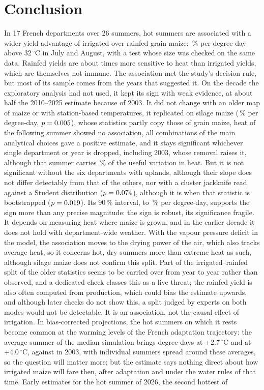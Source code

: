 \section{Conclusion}
\label{sec:conclusion}

In 17 French departments over 26 summers, hot summers are associated with a wider yield advantage of irrigated over rainfed grain maize: \QonePct\,\% per degree-day above 32\,$^{\circ}$C in July and August, with a test whose size was checked on the same data. Rainfed yields are about \QoneRatio{} times more sensitive to heat than irrigated yields, which are themselves not immune. The association met the study's decision rule, but most of its sample comes from the years that suggested it. On the decade the exploratory analysis had not used, it kept its sign with weak evidence, at about half the 2010--2025 estimate because of 2003. It did not change with an older map of maize or with station-based temperatures, it replicated on silage maize (\FodderPct\,\% per degree-day, $p = 0.005$), whose statistics partly copy those of grain maize, heat of the following summer showed no association, all \MultiN{} combinations of the main analytical choices gave a positive estimate, and it stays significant whichever single department or year is dropped, including 2003, whose removal raises it, although that summer carries \LevThree\,\% of the useful variation in heat. But it is not significant without the six departments with uplands, although their slope does not differ detectably from that of the others, nor with a cluster jackknife read against a Student distribution ($p = 0.074$), although it is when that statistic is bootstrapped ($p = 0.019$). Its 90\,\% interval, \CiNinetyLow{} to \CiNinetyHigh\,\% per degree-day, supports the sign more than any precise magnitude: the sign is robust, its significance fragile. It depends on measuring heat where maize is grown, and in the earlier decade it does not hold with department-wide weather. With the vapour pressure deficit in the model, the association moves to the drying power of the air, which also tracks average heat, so it concerns hot, dry summers more than extreme heat as such, although silage maize does not confirm this split. Part of the irrigated--rainfed split of the older statistics seems to be carried over from year to year rather than observed, and a dedicated check classes this as a live threat; the rainfed yield is also often computed from production, which could bias the estimate upwards, and although later checks do not show this, a split judged by experts on both modes would not be detectable. It is an association, not the causal effect of irrigation. In bias-corrected projections, the hot summers on which it rests become common at the warming levels of the French adaptation trajectory: the average summer of the median simulation brings \DriasDdTwoSeven{} degree-days at +2.7\,$^{\circ}$C and \DriasDdFour{} at +4.0\,$^{\circ}$C, against \DriasObsThree{} in 2003, with individual summers spread around these averages, so the question will matter more; but the estimate says nothing direct about how irrigated maize will fare then, after adaptation and under the water rules of that time. Early estimates for the hot summer of 2026, the second hottest of 
